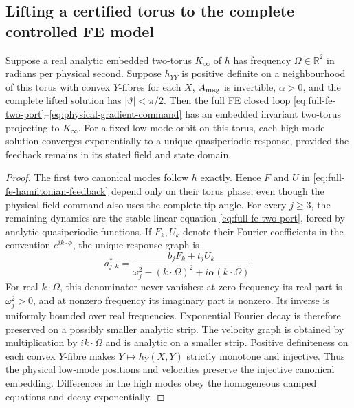 \subsection{Lifting a certified torus to the complete controlled FE model}
\label{sec:full-fe-kam-lift}
\begin{theorem}
\label{thm:full-fe-kam-lift}
Suppose a real analytic embedded two-torus $K_\infty$ of $h$ has frequency
$\Omega\in\mathbb R^2$ in radians per physical second. Suppose $h_{YY}$
is positive definite on a neighbourhood of this torus with convex
$Y$-fibres for each $X$, $A_{\rm mag}$ is invertible,
$\alpha>0$, and the complete lifted solution has
$|\vartheta|<\pi/2$. Then the full FE closed loop
\eqref{eq:full-fe-two-port}--\eqref{eq:physical-gradient-command} has an
embedded invariant two-torus projecting to $K_\infty$. For a fixed low-mode
orbit on this torus, each high-mode solution converges exponentially to a
unique quasiperiodic response, provided the feedback remains in its
stated field and state domain.
\end{theorem}

\begin{proof}
The first two canonical modes follow $h$ exactly. Hence $F$ and $U$ in
\eqref{eq:full-fe-hamiltonian-feedback} depend only on their torus phase,
even though the physical field command also uses the complete tip angle.
For every $j\geq3$, the remaining dynamics are the stable linear equation
\eqref{eq:full-fe-two-port}, forced by analytic quasiperiodic functions.
If $F_k,U_k$ denote their Fourier coefficients in the convention
$e^{ik\cdot\phi}$, the unique response graph is
\begin{equation}
 a^*_{j,k}=
 \frac{b_jF_k+t_jU_k}
      {\omega_j^2-(k\cdot\Omega)^2+i\alpha(k\cdot\Omega)}.
 \label{eq:full-fe-lift-fourier}
\end{equation}
For real $k\cdot\Omega$, this denominator never vanishes: at zero
frequency its real part is $\omega_j^2>0$, and at nonzero frequency its
imaginary part is nonzero. Its inverse is uniformly bounded over real
frequencies. Exponential Fourier decay is therefore preserved on a
possibly smaller analytic strip. The velocity graph is obtained by
multiplication by $ik\cdot\Omega$ and is analytic on a smaller strip.
Positive definiteness on each convex $Y$-fibre makes
$Y\mapsto h_Y(X,Y)$ strictly monotone and injective. Thus the physical
low-mode positions and velocities preserve the injective canonical
embedding. Differences in the high modes obey the
homogeneous damped equations and decay exponentially.
\end{proof}

